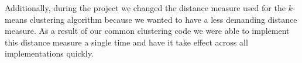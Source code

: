 Additionally, during the project we changed the distance measure used for the $k$-means clustering algorithm because we wanted to have a less demanding distance measure. As a result of our common clustering code we were able to implement this distance measure a single time and have it take effect across all implementations quickly.


\worksheetend